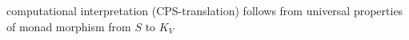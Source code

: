 
computational interpretation (CPS-translation) follows from universal
properties of monad morphism from $S$ to $K_V$
\cite{kockStrongFunctorsMonoidal1972}


